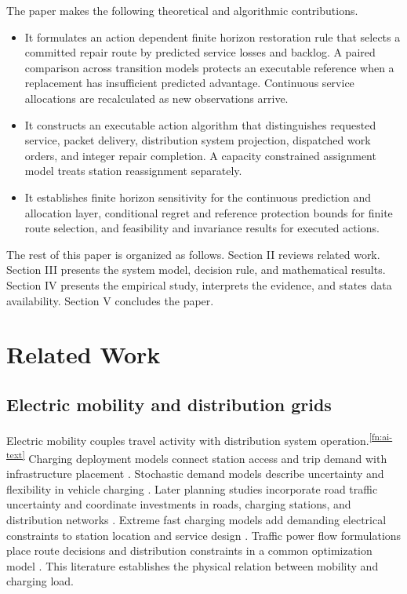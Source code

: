 \documentclass[journal]{IEEEtran}
\newcommand{\AITextRef}{\textsuperscript{\ref{fn:ai-text}}}
\begin{document}
The paper makes the following theoretical and algorithmic contributions.
\begin{itemize}
\item It formulates an action dependent finite horizon restoration rule that
selects a committed repair route by predicted service losses and backlog.
A paired comparison across transition models protects an executable reference
when a replacement has insufficient predicted advantage.  Continuous service
allocations are recalculated as new observations arrive.
\item It constructs an executable action algorithm that distinguishes requested
service, packet delivery, distribution system projection, dispatched work
orders, and integer repair completion.  A capacity constrained assignment model
treats station reassignment separately.
\item It establishes finite horizon sensitivity for the continuous prediction
and allocation layer, conditional regret and reference protection bounds for
finite route selection, and feasibility and invariance results for executed
actions.
\end{itemize}

The rest of this paper is organized as follows.  Section II reviews related
work.  Section III presents the system model, decision rule, and mathematical
results.  Section IV presents the empirical study, interprets the evidence, and
states data availability.  Section V concludes the paper.

\section{Related Work}
\label{sec:related}

\subsection{Electric mobility and distribution grids}

Electric mobility couples travel activity with distribution system operation.\AITextRef
Charging deployment models connect station access and trip demand with
infrastructure placement \cite{he2015charging,sadeghi2014fast}.
Stochastic demand models describe uncertainty and flexibility in vehicle
charging \cite{alizadeh2014pev}.  Later planning studies incorporate road
traffic uncertainty \cite{deb2022charging} and coordinate investments in
roads, charging stations, and distribution networks \cite{li2023milp}.  Extreme
fast charging models add demanding electrical constraints to station location
and service design \cite{qian2021fast}.  Traffic power flow formulations place
route decisions and distribution constraints in a common optimization model
\cite{wei2018trafficpower,lv2020semidynamic}.  This literature establishes the
physical relation between mobility and charging load.
\end{document}
